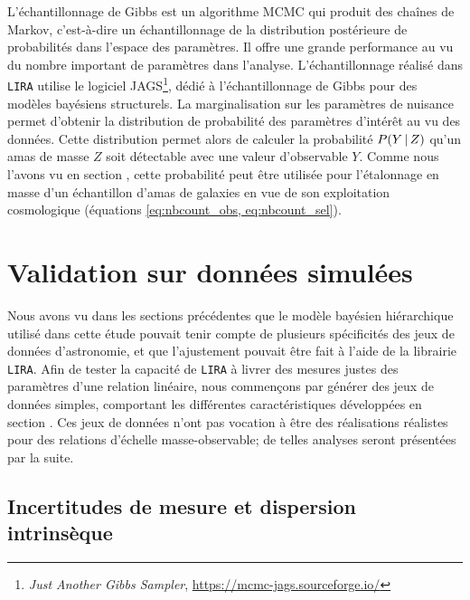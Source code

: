 L'échantillonnage de Gibbs est un algorithme MCMC qui produit des chaînes de Markov, c'est-à-dire un échantillonnage de la distribution postérieure de probabilités dans l'espace des paramètres.
Il offre une grande performance au vu du nombre important de paramètres dans l'analyse.
L'échantillonnage réalisé dans \texttt{LIRA} utilise le logiciel JAGS\footnote{\textit{Just Another Gibbs Sampler}, \url{https://mcmc-jags.sourceforge.io/}}, dédié à l'échantillonnage de Gibbs pour des modèles bayésiens structurels.
La marginalisation sur les paramètres de nuisance permet d'obtenir la distribution de probabilité des paramètres d'intérêt au vu des données.
Cette distribution permet alors de calculer la probabilité $P({Y\,|\,Z})$ qu'un amas de masse $Z$ soit détectable avec une valeur d'observable $Y$.
Comme nous l'avons vu en section , cette probabilité peut être utilisée pour l'étalonnage en masse d'un échantillon d'amas de galaxies en vue de son exploitation cosmologique (équations \ref{eq:nbcount_obs, eq:nbcount_sel}).

\section{Validation sur données simulées}
\label{sec:scaling:valid}

Nous avons vu dans les sections précédentes que le modèle bayésien hiérarchique utilisé dans cette étude pouvait tenir compte de plusieurs spécificités des jeux de données d'astronomie, et que l'ajustement pouvait être fait à l'aide de la librairie \texttt{LIRA}.
Afin de tester la capacité de \texttt{LIRA} à livrer des mesures justes des paramètres d'une relation linéaire, nous commençons par générer des jeux de données simples, comportant les différentes caractéristiques développées en section .
Ces jeux de données n'ont pas vocation à être des réalisations réalistes pour des relations d'échelle masse-observable; de telles analyses seront présentées par la suite.

\subsection{Incertitudes de mesure et dispersion intrinsèque}
\label{sec:scaling:valid1}

